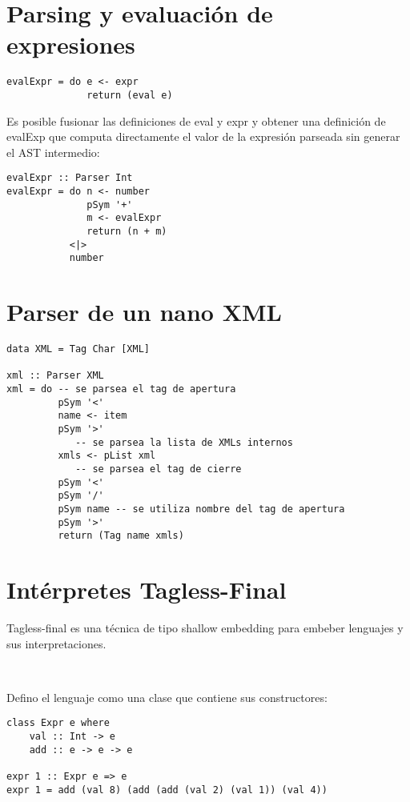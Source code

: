 \documentclass{article}
\newcommand{\imp}[1]{\textcolor{color1}{#1}}
\begin{document}
\section{Parsing y evaluación de expresiones}

\begin{lstlisting}
evalExpr = do e <- expr
              return (eval e)
\end{lstlisting}
Es posible fusionar las definiciones de eval y expr y obtener una definición de evalExp que computa directamente el valor de la expresión parseada sin generar el AST intermedio:
\begin{lstlisting}
evalExpr :: Parser Int
evalExpr = do n <- number
              pSym '+'
              m <- evalExpr
              return (n + m)
           <|>
           number
\end{lstlisting}

\newpage

\section{Parser de un nano XML}

\begin{lstlisting}
data XML = Tag Char [XML]

xml :: Parser XML
xml = do -- se parsea el tag de apertura
         pSym '<'
         name <- item
         pSym '>'
            -- se parsea la lista de XMLs internos
         xmls <- pList xml
            -- se parsea el tag de cierre
         pSym '<'
         pSym '/'
         pSym name -- se utiliza nombre del tag de apertura
         pSym '>'
         return (Tag name xmls)
\end{lstlisting}

\section{Intérpretes Tagless-Final}

\noindent \imp{Tagless-final} es una técnica de tipo \imp{shallow embedding} para embeber lenguajes y sus interpretaciones.

\

Defino el lenguaje como una \imp{clase} que contiene sus constructores:

\begin{lstlisting}
class Expr e where
    val :: Int -> e
    add :: e -> e -> e

expr 1 :: Expr e => e
expr 1 = add (val 8) (add (add (val 2) (val 1)) (val 4))
\end{lstlisting}
\end{document}
